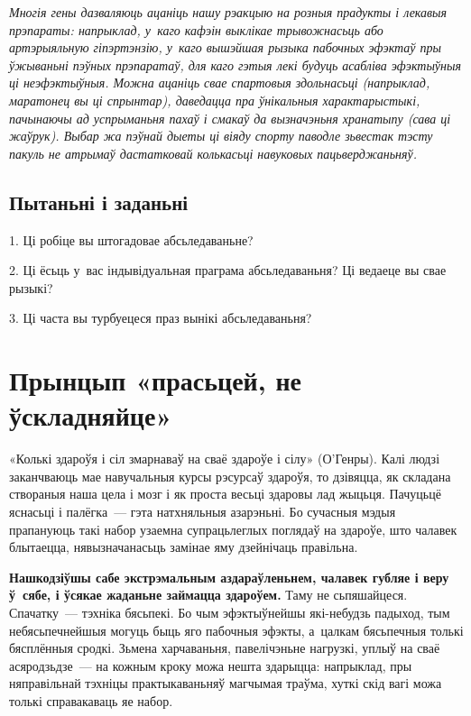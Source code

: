 \emph{Многія гены дазваляюць ацаніць нашу рэакцыю на розныя прадукты і лекавыя прэпараты: напрыклад, у~каго кафэін выклікае трывожнасьць або артэрыяльную гіпэртэнзію, у~каго вышэйшая рызыка пабочных эфэктаў пры ўжываньні пэўных прэпаратаў, для каго гэтыя лекі будуць асабліва эфэктыўныя ці неэфэктыўныя. Можна ацаніць свае спартовыя здольнасьці (напрыклад, маратонец вы ці спрынтар), даведацца пра ўнікальныя характарыстыкі, пачынаючы ад успрыманьня пахаў і смакаў да вызначэньня хранатыпу (сава ці жаўрук). Выбар жа пэўнай дыеты ці віяду спорту паводле зьвестак тэсту пакуль не атрымаў дастатковай колькасьці навуковых пацьверджаньняў.}

\subsection*{Пытаньні і заданьні}

1. Ці робіце вы штогадовае абсьледаваньне?

2. Ці ёсьць у~вас індывідуальная праграма абсьледаваньня? Ці ведаеце вы свае рызыкі?

3. Ці часта вы турбуецеся праз вынікі абсьледаваньня?


\section{Прынцып «прасьцей, не ўскладняйце»}

«Колькі здароўя і сіл змарнаваў на сваё здароўе і сілу» (О'Генры). Калі людзі заканчваюць мае навучальныя курсы рэсурсаў здароўя, то дзівяцца, як складана створаныя наша цела і мозг і як проста весьці здаровы лад жыцьця. Пачуцьцё яснасьці і палёгка~--- гэта натхняльныя азарэньні. Бо сучасныя мэдыя прапануюць такі набор узаемна супрацьлеглых поглядаў на здароўе, што чалавек блытаецца, нявызначанасьць замінае яму дзейнічаць правільна.

\textbf{Нашкодзіўшы сабе экстрэмальным аздараўленьнем, чалавек губляе і веру ў~сябе, і ўсякае жаданьне займацца здароўем.} Таму не сьпяшайцеся. Спачатку~--- тэхніка бясьпекі. Бо чым эфэктыўнейшы які-небудзь падыход, тым небясьпечнейшыя могуць быць яго пабочныя эфэкты, а~цалкам бясьпечныя толькі бясплённыя сродкі. Зьмена харчаваньня, павелічэньне нагрузкі, уплыў на сваё асяродзьдзе~--- на кожным кроку можа нешта здарыцца: напрыклад, пры няправільнай тэхніцы практыкаваньняў магчымая траўма, хуткі скід вагі можа толькі справакаваць яе набор.

